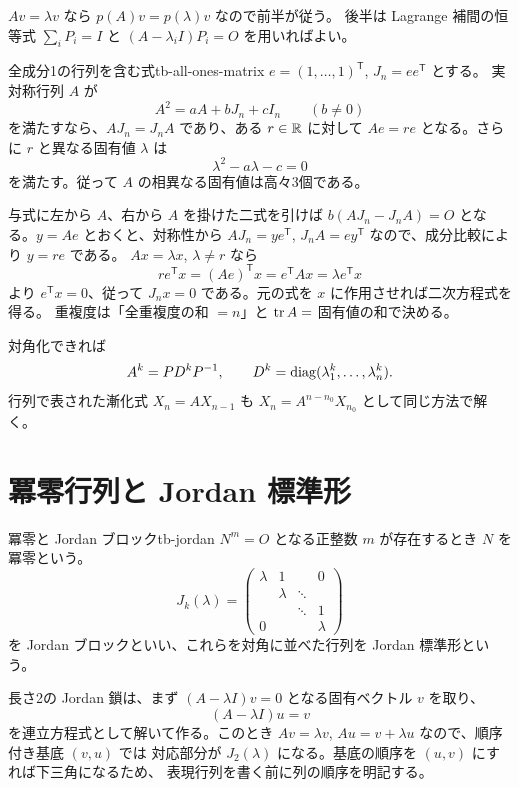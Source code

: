 $Av=\lambda v$ なら $p(A)v=p(\lambda)v$ なので前半が従う。
後半は Lagrange 補間の恒等式 $\sum_iP_i=I$ と
$(A-\lambda_iI)P_i=O$ を用いればよい。

\begin{proposition}{全成分1の行列を含む式}{tb-all-ones-matrix}
$e=(1,\ldots,1)^{\mathsf T}$, $J_n=ee^{\mathsf T}$ とする。
実対称行列 $A$ が
\[
A^2=aA+bJ_n+cI_n\qquad(b\ne0)
\]
を満たすなら、$AJ_n=J_nA$ であり、ある $r\in\mathbb{R}$ に対して
$Ae=re$ となる。さらに $r$ と異なる固有値 $\lambda$ は
\[
\lambda^2-a\lambda-c=0
\]
を満たす。従って $A$ の相異なる固有値は高々3個である。
\end{proposition}

与式に左から $A$、右から $A$ を掛けた二式を引けば
$b(AJ_n-J_nA)=O$ となる。$y=Ae$ とおくと、対称性から
$AJ_n=ye^{\mathsf T}$, $J_nA=ey^{\mathsf T}$ なので、成分比較により $y=re$ である。
$Ax=\lambda x$, $\lambda\ne r$ なら
\[
r e^{\mathsf T}x=(Ae)^{\mathsf T}x=e^{\mathsf T}Ax
=\lambda e^{\mathsf T}x
\]
より $e^{\mathsf T}x=0$、従って $J_nx=0$ である。元の式を $x$ に作用させれば二次方程式を得る。
重複度は「全重複度の和 $=n$」と $\operatorname{tr} A=$ 固有値の和で決める。

対角化できれば
\[
A^k=PD^kP^{-1},\qquad
D^k=\operatorname{diag}(\lambda_1^k,\ldots,\lambda_n^k).
\]
行列で表された漸化式 $X_n=AX_{n-1}$ も $X_n=A^{n-n_0}X_{n_0}$ として同じ方法で解く。

\section{冪零行列と Jordan 標準形}

\begin{definition}{冪零と Jordan ブロック}{tb-jordan}
$N^m=O$ となる正整数 $m$ が存在するとき $N$ を冪零という。
\[
J_k(\lambda)=
\begin{pmatrix}
\lambda&1&&0\\
&\lambda&\ddots&\\
&&\ddots&1\\
0&&&\lambda
\end{pmatrix}
\]
を Jordan ブロックといい、これらを対角に並べた行列を Jordan 標準形という。
\end{definition}

長さ2の Jordan 鎖は、まず $(A-\lambda I)v=0$ となる固有ベクトル $v$ を取り、
\[
(A-\lambda I)u=v
\]
を連立方程式として解いて作る。このとき
$Av=\lambda v$, $Au=v+\lambda u$ なので、順序付き基底 $(v,u)$ では
対応部分が $J_2(\lambda)$ になる。基底の順序を $(u,v)$ にすれば下三角になるため、
表現行列を書く前に列の順序を明記する。


